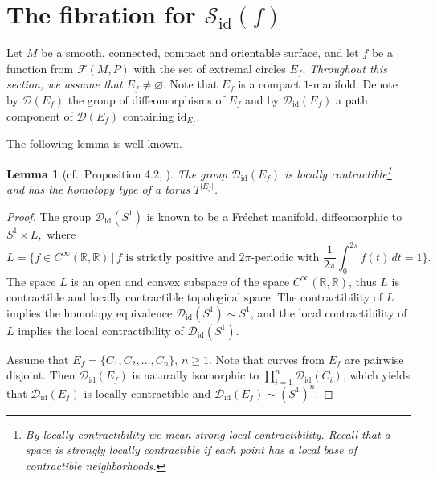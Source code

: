 \documentclass[10pt,reqno]{amsart}
\newtheorem{lemma}[subsection]{Lemma}
\newcommand{\bbR}{\mathbb{R}}
\newcommand{\Sid}{\mathcal{S}_{\id}(f)}
\newcommand{\F}{\mathcal{F}(M,P)}
\newcommand{\id}{\mathrm{id}}
\newcommand{\textr}[1]{\textcolor{black}{#1}}
\begin{document}
\section{The fibration for $\Sid$}\label{sec:fibration-rho}
Let $M$ be a smooth, connected, compact and  \textr{orientable} surface, and let $f$ be a function from $\F$ with the set of extremal circles $E_f$. {\it Throughout this section, we assume that $E_f\neq \varnothing$}. 
Note that $E_f$ is a compact $1$-manifold. Denote by $\mathcal{D}(E_f)$ the group of diffeomorphisms of $E_f$ and by $\mathcal{D}_{\id}(E_f)$ a \textr{path} component of $\mathcal{D}(E_f)$ containing $\id_{E_f}$. 
{The following lemma is well-known.
\begin{lemma}[cf.~Proposition 4.2, \cite{Ghys:Enseign:2001}]\label{lm:DidE}
	The group $\mathcal{D}_{\id}(E_f)$ is locally contractible\footnote{By locally contractibility  we mean {\it strong} local contractibility. Recall that a space is strongly locally contractible if each point has a local base of contractible neighborhoods.} and has the homotopy type of a torus $T^{|E_f|}$.
\end{lemma}
\begin{proof}
	The group  $\mathcal{D}_{\id}(S^1)$ is known to be a Fr\'echet manifold, diffeomorphic to $S^1\times L,$ where 
	$$
	L = \Bigg\{f\in C^{\infty}(\mathbb{R}, \bbR)\,\Big|\, f\text{ is strictly positive and $2\pi$-periodic with }  \frac{1}{2\pi}\int_0^{2\pi} f(t)\,dt = 1 \Bigg\}.
	$$
	The space $L$ is an open and convex subspace of the space $C^{\infty}(\bbR, \bbR)$, thus $L$ is contractible and  locally contractible topological space. The contractibility of $L$ implies the homotopy equivalence $\mathcal{D}_{\id}(S^1)\sim S^1$, and the local contractibility of $L$ implies the local contractibility of $\mathcal{D}_{\id}(S^1)$.
	
	Assume that $E_f = \{C_1,C_2,\ldots, C_n\}$, $n\geq 1$. Note that curves from  $E_f$ are pairwise disjoint. Then $\mathcal{D}_{\id}(E_f)$ is naturally isomorphic to $\prod_{i = 1}^n\mathcal{D}_{\id}(C_i)$, which yields that $\mathcal{D}_{\id}(E_f)$ is locally contractible and $\mathcal{D}_{\id}(E_f)\sim (S^1)^n$.
\end{proof}
}
\end{document}
